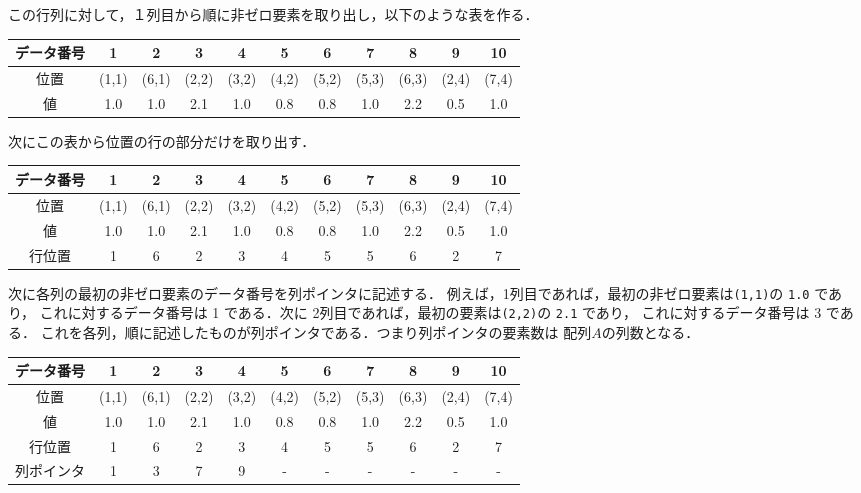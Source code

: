 この行列に対して，１列目から順に非ゼロ要素を取り出し，以下のような表を作る．
\begin{table}[htbp]
  \begin{center}
    \leavevmode
    \begin{tabular}{|c||c|c|c|c|c|c|c|c|c|c|} \hline
データ番号  & 1  & 2 & 3 & 4 & 5 & 6 & 7 & 8 & 9 & 10 \\ \hline
位置       & (1,1) & (6,1) & (2,2) & (3,2) & (4,2) & (5,2) & (5,3) & (6,3) & (2,4) & (7,4) \\ \hline
値    & 1.0   & 1.0 & 2.1 & 1.0 & 0.8 & 0.8 & 1.0 & 2.2 & 0.5 & 1.0 \\ \hline
    \end{tabular}
  \end{center}
\end{table}

次にこの表から位置の行の部分だけを取り出す．

\begin{table}[htbp]
  \begin{center}
    \leavevmode
    \begin{tabular}{|c||c|c|c|c|c|c|c|c|c|c|} \hline
データ番号  & 1  & 2 & 3 & 4 & 5 & 6 & 7 & 8 & 9 & 10 \\ \hline
位置       & (1,1) & (6,1) & (2,2) & (3,2) & (4,2) & (5,2) & (5,3) & (6,3) & (2,4) & (7,4) \\ \hline
値    & 1.0   & 1.0 & 2.1 & 1.0 & 0.8 & 0.8 & 1.0 & 2.2 & 0.5 & 1.0 \\ \hline
行位置  & 1 & 6 & 2 & 3 & 4 & 5 & 5 & 6 & 2 & 7 \\ \hline
    \end{tabular}
  \end{center}
\end{table}

次に各列の最初の非ゼロ要素のデータ番号を列ポインタに記述する．
例えば，1列目であれば，最初の非ゼロ要素は\verb|(1,1)|の \verb|1.0| であり，
これに対するデータ番号は 1 である．次に
2列目であれば，最初の要素は\verb|(2,2)|の \verb|2.1| であり，
これに対するデータ番号は 3 である．
これを各列，順に記述したものが列ポインタである．つまり列ポインタの要素数は
配列\( A \)の列数となる．

\begin{table}[htbp]
  \begin{center}
    \leavevmode
    \begin{tabular}{|c||c|c|c|c|c|c|c|c|c|c|} \hline
データ番号  & 1     & 2     & 3    & 4      & 5     & 6     & 7     & 8     & 9     & 10 \\ \hline
位置       & (1,1) & (6,1) & (2,2) & (3,2) & (4,2) & (5,2) & (5,3) & (6,3) & (2,4) & (7,4) \\ \hline
値          & 1.0   & 1.0 & 2.1 & 1.0 & 0.8 & 0.8 & 1.0 & 2.2 & 0.5 & 1.0 \\ \hline
行位置  & 1 & 6 & 2 & 3 & 4 & 5 & 5 & 6 & 2 & 7 \\ \hline
列ポインタ  & 1 & 3 & 7 & 9 & - & - & - & - & - & - \\ \hline
    \end{tabular}
  \end{center}
\end{table}

